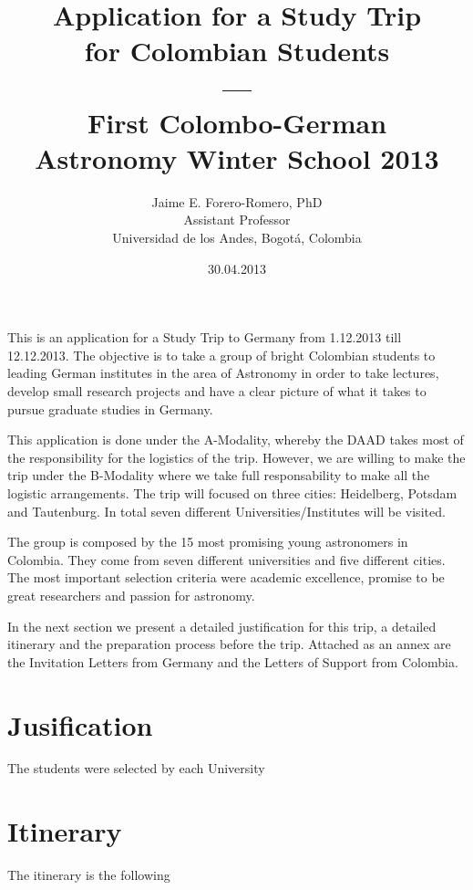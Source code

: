 \documentclass[12pt]{article}
\title{Application for a Study Trip \\ for Colombian
  Students\\---\\ First Colombo-German \\ Astronomy Winter School 2013}
\author{Jaime E. Forero-Romero, PhD \\ {\small Assistant Professor}
  \\ {\small Universidad de los Andes, Bogot\'a, Colombia}}
\date{30.04.2013}
\begin{document}
\maketitle
This is an application for a Study Trip to Germany from 1.12.2013 till
12.12.2013. The objective is to take a group of bright Colombian students to
leading German institutes in the area of Astronomy in order to take lectures,
develop small research projects and have a clear picture of what it
takes to pursue graduate studies in Germany. 

This application is done under the A-Modality, whereby the DAAD takes
most of the responsibility for the logistics of the trip. However, we
are willing to make the trip under the B-Modality where we take full
responsability to make all the logistic arrangements. The trip will
focused on three cities: Heidelberg, Potsdam and Tautenburg. In total
seven different Universities/Institutes will be visited.

The group is composed by the 15 most promising young astronomers in
Colombia. They come from seven different universities and five different
cities. The most important selection criteria were academic excellence,
promise to be great researchers and passion for astronomy.

In the next section we present a detailed justification for this trip,
a detailed itinerary and the preparation process before the
trip. Attached as an annex are the Invitation Letters from Germany and
the Letters of Support from Colombia.

\newpage

\section{Jusification}

The students were selected by each University

\section{Itinerary}
The itinerary is the following
\end{document}

